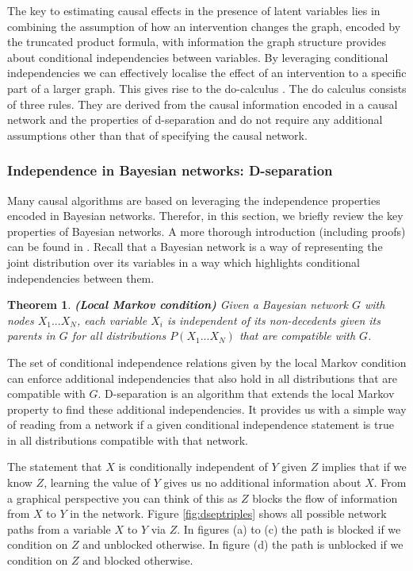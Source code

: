 \documentclass[11pt,a4paper,oneside]{book}
\theoremstyle{plain}
\newtheorem{theorem}{Theorem}
\theoremstyle{definition}
\begin{document}
The key to estimating causal effects in the presence of latent variables lies in combining the assumption of how an intervention changes the graph, encoded by the truncated product formula, with information the graph structure provides about conditional independencies between variables. 
By leveraging conditional independencies we can effectively localise the effect of an intervention to a specific part of a larger graph. This gives rise to the do-calculus \citep{Pearl2000}. The do calculus consists of three rules. They are derived from the causal information encoded in a causal network and the properties of d-separation and do not require any additional assumptions other than that of specifying the causal network.

\subsubsection{Independence in Bayesian networks: D-separation}
\label{sec:dsep}

Many causal algorithms are based on leveraging the independence properties encoded in Bayesian networks. Therefor, in this section, we briefly review the key properties of Bayesian networks. A more thorough introduction (including proofs) can be found in \citep{Koller2009}. Recall that a Bayesian network is a way of representing the joint distribution over its variables in a way which highlights conditional independencies between them. 

\vspace{.3cm}
\begin{theorem}
\textbf{(Local Markov condition)} Given a Bayesian network $G$ with nodes $X_{1}...X_{N}$, each variable $X_{i}$ is independent of its non-decedents given its parents in $G$ for all distributions $P(X_{1}...X_{N})$ that are compatible with $G$.
\end{theorem}

The set of conditional independence relations given by the local Markov condition can enforce additional independencies that also hold in all distributions that are compatible with $G$. D-separation is an algorithm that extends the local Markov property to find these additional independencies. It provides us with a simple way of reading from a network if a given conditional independence statement is true in all distributions compatible with that network.


The statement that $X$ is conditionally independent of $Y$ given $Z$ implies that if we know $Z$, learning the value of $Y$ gives us no additional information about $X$. From a graphical perspective you can think of this as $Z$ blocks the flow of information from $X$ to $Y$ in the network. Figure \ref{fig:dseptriples} shows all possible network paths from a variable $X$ to $Y$ via $Z$. In figures (a) to (c) the path is blocked if we condition on $Z$ and unblocked otherwise. In figure (d) the path is unblocked if we condition on $Z$ and blocked otherwise. 
\end{document}
